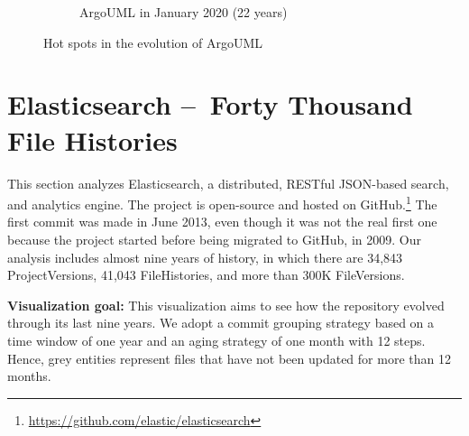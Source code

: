 \begin{figure}[ht]
\begin{subfigure}{0.48\textwidth}
        \caption{ArgoUML in January 2020 (22 years)} 
        \label{fig:ArgoUML_V3_S6}
    \end{subfigure}
    
    \caption{Hot spots in the evolution of ArgoUML} 
    \label{fig:ArgoUML_V3}
\end{figure}
\clearpage

\section{Elasticsearch – Forty Thousand File Histories}
This section analyzes Elasticsearch, a distributed, RESTful JSON-based search, and analytics engine. 
The project is open-source and hosted on GitHub.\footnote{\url{https://github.com/elastic/elasticsearch}}
The first commit was made in June 2013, even though it was not the real first one because the project started before being migrated to GitHub, in 2009.
Our analysis includes almost nine years of history, in which there are 34,843 ProjectVersions, 41,043 FileHistories, and more than 300K FileVersions. 

\bigbreak
\textbf{Visualization goal:}
This visualization aims to see how the repository evolved through its last nine years. We adopt a commit grouping strategy based on a time window of one year and an aging strategy of one month with 12 steps. Hence, grey entities represent files that have not been updated for more than 12 months. 



